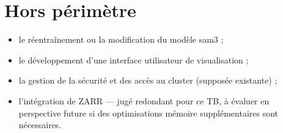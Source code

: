 \section{Hors périmètre}

\begin{itemize}
    \item le réentraînement ou la modification du modèle \gls{sam3} ;
    \item le développement d'une interface utilisateur de visualisation ;
    \item la gestion de la sécurité et des accès au cluster (supposée existante) ;
    \item l'intégration de ZARR --- jugé redondant pour ce TB,
          à évaluer en perspective future si des optimisations mémoire supplémentaires sont nécessaires.
\end{itemize}

